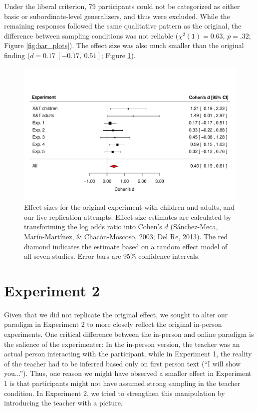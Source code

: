 \documentclass[man]{apa2}
\begin{document}
Under the liberal criterion, 79 participants could not be categorized as either basic or subordinate-level generalizers, and thus were excluded. While the remaining responses followed the same qualitative pattern as the original, the difference between sampling conditions was not reliable ($\chi^2(1) = 0.63$, $p = .32$; Figure \ref{fig:bar_plots}). The effect size was also much smaller than the original finding ($d = 0.17\ [-0.17,\ 0.51]$; Figure \ref{fig:effect_sizes}).

\begin{figure} [t]
  \centering
  \includegraphics[width=6in]{figures/FIG_3.pdf} 
  \caption{\label{fig:effect_sizes} Effect sizes for the original experiment with children and adults, and our five replication attempts. Effect size estimates are calculated  by transforiming the log odds ratio into Cohen's $d$ (S\'{a}nchez-Meca, Mar\'{i}n-Mart\'{i}nez, \& Chac\'{o}n-Moscoso, 2003; Del Re, 2013). The red diamond indicates the estimate based on a random effect model of all seven studies. Error bars are 95\% confidence intervals.} 
\end{figure}


\section{Experiment 2}

Given that we did not replicate the original effect, we sought to alter our paradigm in Experiment 2 to more closely reflect the original in-person experiments. One critical difference between the in-person and online paradigm is the salience of the experimenter: In the in-person version, the teacher was an actual person interacting with the participant, while in Experiment 1, the reality of the teacher had to be inferred based only on first person text (``I will show you...''). Thus, one reason we might have observed a smaller effect in Experiment 1 is that participants might not have assumed strong sampling in the teacher condition. In Experiment 2, we tried to strengthen this manipulation by introducing the teacher with a picture.
\end{document}
